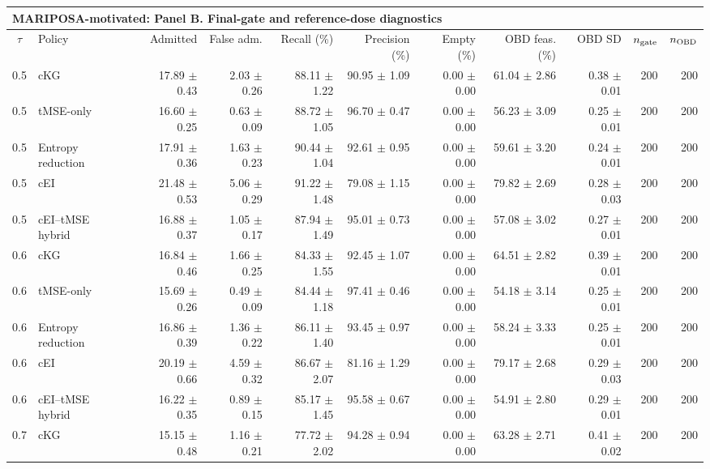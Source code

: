 \begin{tabular}{@{}clrrrrrrrrr@{}}
\multicolumn{11}{l}{\textbf{MARIPOSA-motivated: Panel B. Final-gate and reference-dose diagnostics}} \\
\toprule
$\tau$ & Policy & Admitted & False adm. & Recall (\%) & Precision (\%) & Empty (\%) & OBD feas. (\%) & OBD SD & $n_{\rm gate}$ & $n_{\rm OBD}$ \\
\midrule
0.5 & cKG & 17.89 $\pm$ 0.43 & 2.03 $\pm$ 0.26 & 88.11 $\pm$ 1.22 & 90.95 $\pm$ 1.09 & 0.00 $\pm$ 0.00 & 61.04 $\pm$ 2.86 & 0.38 $\pm$ 0.01 & 200 & 200 \\
0.5 & tMSE-only & 16.60 $\pm$ 0.25 & 0.63 $\pm$ 0.09 & 88.72 $\pm$ 1.05 & 96.70 $\pm$ 0.47 & 0.00 $\pm$ 0.00 & 56.23 $\pm$ 3.09 & 0.25 $\pm$ 0.01 & 200 & 200 \\
0.5 & Entropy reduction & 17.91 $\pm$ 0.36 & 1.63 $\pm$ 0.23 & 90.44 $\pm$ 1.04 & 92.61 $\pm$ 0.95 & 0.00 $\pm$ 0.00 & 59.61 $\pm$ 3.20 & 0.24 $\pm$ 0.01 & 200 & 200 \\
0.5 & cEI & 21.48 $\pm$ 0.53 & 5.06 $\pm$ 0.29 & 91.22 $\pm$ 1.48 & 79.08 $\pm$ 1.15 & 0.00 $\pm$ 0.00 & 79.82 $\pm$ 2.69 & 0.28 $\pm$ 0.03 & 200 & 200 \\
0.5 & cEI--tMSE hybrid & 16.88 $\pm$ 0.37 & 1.05 $\pm$ 0.17 & 87.94 $\pm$ 1.49 & 95.01 $\pm$ 0.73 & 0.00 $\pm$ 0.00 & 57.08 $\pm$ 3.02 & 0.27 $\pm$ 0.01 & 200 & 200 \\
0.6 & cKG & 16.84 $\pm$ 0.46 & 1.66 $\pm$ 0.25 & 84.33 $\pm$ 1.55 & 92.45 $\pm$ 1.07 & 0.00 $\pm$ 0.00 & 64.51 $\pm$ 2.82 & 0.39 $\pm$ 0.01 & 200 & 200 \\
0.6 & tMSE-only & 15.69 $\pm$ 0.26 & 0.49 $\pm$ 0.09 & 84.44 $\pm$ 1.18 & 97.41 $\pm$ 0.46 & 0.00 $\pm$ 0.00 & 54.18 $\pm$ 3.14 & 0.25 $\pm$ 0.01 & 200 & 200 \\
0.6 & Entropy reduction & 16.86 $\pm$ 0.39 & 1.36 $\pm$ 0.22 & 86.11 $\pm$ 1.40 & 93.45 $\pm$ 0.97 & 0.00 $\pm$ 0.00 & 58.24 $\pm$ 3.33 & 0.25 $\pm$ 0.01 & 200 & 200 \\
0.6 & cEI & 20.19 $\pm$ 0.66 & 4.59 $\pm$ 0.32 & 86.67 $\pm$ 2.07 & 81.16 $\pm$ 1.29 & 0.00 $\pm$ 0.00 & 79.17 $\pm$ 2.68 & 0.29 $\pm$ 0.03 & 200 & 200 \\
0.6 & cEI--tMSE hybrid & 16.22 $\pm$ 0.35 & 0.89 $\pm$ 0.15 & 85.17 $\pm$ 1.45 & 95.58 $\pm$ 0.67 & 0.00 $\pm$ 0.00 & 54.91 $\pm$ 2.80 & 0.29 $\pm$ 0.01 & 200 & 200 \\
0.7 & cKG & 15.15 $\pm$ 0.48 & 1.16 $\pm$ 0.21 & 77.72 $\pm$ 2.02 & 94.28 $\pm$ 0.94 & 0.00 $\pm$ 0.00 & 63.28 $\pm$ 2.71 & 0.41 $\pm$ 0.02 & 200 & 200 \\

\end{tabular}
